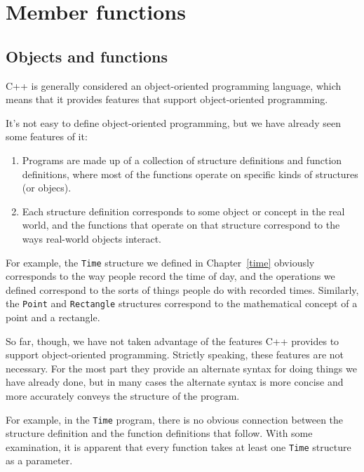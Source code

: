 

\chapter{Member functions}

\section{Objects and functions}

C++ is generally considered an object-oriented programming language,
which means that it provides features that support object-oriented
programming.

It's not easy to define object-oriented programming, but we have
already seen some features of it:

\begin{enumerate}

\item Programs are made up of a collection of structure definitions
and function definitions, where most of the functions operate on
specific kinds of structures (or objecs).

\item Each structure definition corresponds to some
object or concept in the real world, and the functions that operate
on that structure correspond to the ways real-world objects interact.

\end{enumerate}

For example, the {\tt Time} structure we defined in Chapter~\ref{time}
obviously corresponds to the way people record the time of day,
and the operations we defined correspond to the sorts of things
people do with recorded times.  Similarly, the {\tt Point} and
{\tt Rectangle} structures correspond to the mathematical concept
of a point and a rectangle.

So far, though, we have not taken advantage of the features C++
provides to support object-oriented programming.  Strictly speaking,
these features are not necessary.  For the most part they provide
an alternate syntax for doing things we have already done, but
in many cases the alternate syntax is more concise and more
accurately conveys the structure of the program.

For example, in the {\tt Time} program, there is
no obvious connection between the structure definition and the
function definitions that follow.  With some examination, it
is apparent that every function takes at least one {\tt Time}
structure as a parameter.

